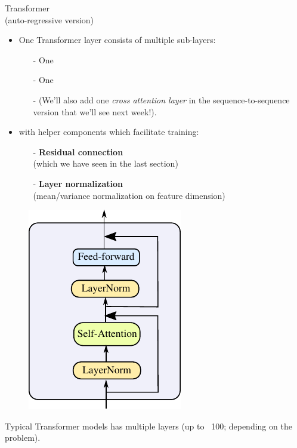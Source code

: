 \begin{frame}{Transformer\\
(auto-regressive version)}
\vsp
\begin{minipage}{0.6\linewidth}
\begin{itemize}
\item One Transformer layer  consists of multiple sub-layers:
\begin{itemize}
\item[-] One 
\item[-] One 
\item[-] (We'll also add one \textit{cross attention layer} in the sequence-to-sequence version that we'll see next week!).
\end{itemize}
\vsp
\item with helper components which facilitate training:
\begin{itemize}
\item[-] \textbf{Residual connection} \\(which we have seen in the last section)
\item[-] \textbf{Layer normalization} \\(mean/variance normalization on feature dimension)
\end{itemize}
\end{itemize}
\vspace{3mm}

\end{minipage}
\begin{minipage}{0.35\linewidth}
\begin{figure}
\centering
\includegraphics[width=.8\linewidth]{./figures/trafo_only.pdf}
\end{figure}
\end{minipage}
\vspace{5mm}
{\small Typical Transformer models has multiple layers (up to ~100; depending on the problem).}
\end{frame}


